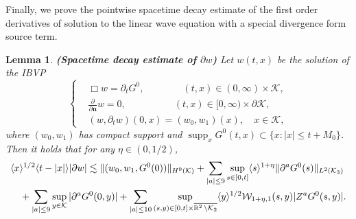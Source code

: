 \documentclass[11pt,twoside]{article}
\def\cK{\mathcal K}
\def\cW{\mathcal W}
\def\R{\mathop{\mathbb R\kern 0pt}\nolimits}
\def\supp{\mathop{\rm supp}\nolimits}
\def\p{\partial}
\def\supp{\operatorname{supp}}
\def\ls{\lesssim}
\def\bn{\mathbf{n}}
\newcommand{\w}[1]{\langle {#1} \rangle}
\theoremstyle{plain}
\newtheorem{lemma}[theorem]{Lemma}
\theoremstyle{definition}
\numberwithin{equation}{section}
\begin{document}
Finally, we prove the pointwise spacetime decay estimate of the first order derivatives of solution to the linear wave equation
with a special divergence form source term.
\begin{lemma}
{\bf (Spacetime decay estimate of $\p w$)}
Let $w(t,x)$ be the solution of the IBVP
\begin{equation*}
\left\{
\begin{aligned}
&\Box w=\p_tG^0,\qquad \qquad(t,x)\in(0,\infty)\times\cK,\\
&\frac{\p}{\p\bn}w=0,\qquad\qquad\quad (t,x)\in[0,\infty)\times\p\cK,\\
&(w,\p_tw)(0,x)=(w_0,w_1)(x),\quad x\in\cK,
\end{aligned}
\right.
\end{equation*}
where $(w_0,w_1)$ has compact support and $\supp_x G^0(t,x)\subset\{x: |x|\le t+M_0\}$.
Then it holds that for any $\eta\in(0,1/2)$,
\begin{equation}\label{dtpw:ibvp}
\begin{split}
&\w{x}^{1/2}\w{t-|x|}|\p w|\ls\|(w_0,w_1,G^0(0))\|_{H^9(\cK)}+\sum_{|a|\le9}\sup_{s\in[0,t]}\w{s}^{1+\eta}\|\p^aG^0(s)\|_{L^2(\cK_3)}\\
&\quad+\sum_{|a|\le9}\sup_{y\in\cK}|\p^aG^0(0,y)|
+\sum_{|a|\le10}\sup_{(s,y)\in[0,t]\times\overline{\R^2\setminus\cK_2}}\w{y}^{1/2}\cW_{1+\eta,1}(s,y)|Z^aG^0(s,y)|.
\end{split}
\end{equation}
\end{lemma}
\end{document}

